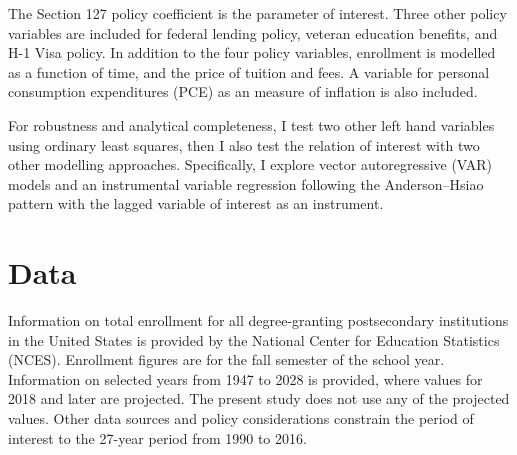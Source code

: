 \documentclass[review]{elsarticle}
\begin{document}
    The Section 127 policy coefficient is the parameter of interest.
    Three other policy variables are included for federal lending policy, veteran education benefits, and H-1 Visa policy.
    In addition to the four policy variables, 
    enrollment is modelled as a function of time,
    and the price of tuition and fees.
    A variable for personal consumption expenditures (PCE) as an measure of inflation is also included.

    For robustness and analytical completeness, I test two other left hand variables using ordinary least squares,
    then I also test the relation of interest with two other modelling approaches.
    Specifically, I explore vector autoregressive (VAR) models
    and an instrumental variable regression following the Anderson–Hsiao pattern\cite{anderson1981estimation} with the lagged variable of interest as an instrument.

    \section{Data}

    Information on total enrollment for all degree-granting postsecondary institutions in the United States
    is provided by the National Center for Education Statistics (NCES)\cite{nces_2019}.
    Enrollment figures are for the fall semester of the school year.
    Information on selected years from 1947 to 2028 is provided, where values for 2018 and later are projected.
    The present study does not use any of the projected values.
    Other data sources and policy considerations constrain the period of interest to the 27-year period from 1990 to 2016.    


\end{document}
